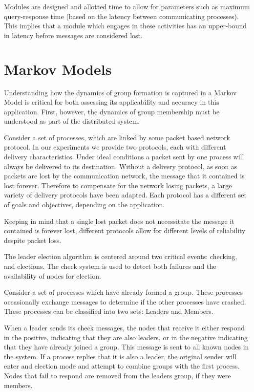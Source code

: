 Modules are designed and allotted time to allow for parameters such as maximum
query-response time (based on the latency between communicating processes). 
This implies that a module which engages in these activities has an
upper-bound in latency before messages are considered lost.

\section{Markov Models}
Understanding how the dynamics of group formation is captured in a Markov Model 
is critical for both assessing its applicability and accuracy in this 
application. First, however, the dynamics of group membership must be 
understood as part of the distributed system.

Consider a set of processes, which are linked by some packet based network 
protocol. In our experiments we provide two protocols, each with different 
delivery characteristics. Under ideal conditions a packet sent by one process 
will always be delivered to its destination. Without a delivery protocol, as 
soon as packets are lost by the communication network, the message that it 
contained is lost forever. Therefore to compensate for the network losing 
packets, a large variety of delivery protocols have been adapted. Each protocol 
has a different set of goals and objectives, depending on the application.

Keeping in mind that a single lost packet does not necessitate the message it 
contained is forever lost, different protocols allow for different levels of 
reliability despite packet loss.

The leader election algorithm is centered around two critical events: checking, 
and elections. The check system is used to detect both failures and the 
availability of nodes for election.

Consider a set of processes which have already formed a group. These processes 
occasionally exchange messages to determine if the other processes have 
crashed. These processes can be classified into two sets: Leaders and Members.

When a leader sends its check messages, the nodes that receive it either 
respond in the positive, indicating that they are also leaders, or in the 
negative indicating that they have already joined a group. This message is sent 
to all known nodes in the system. If a process replies that it is also a 
leader, the original sender will enter and election mode and attempt to combine 
groups with the first process. Nodes that fail to respond are removed from the 
leaders group, if they were members.

